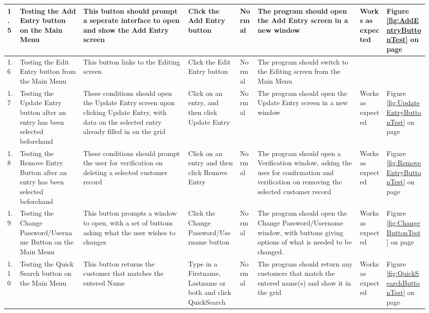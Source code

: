 \begin{landscape}
\begin{center}
\begin{longtable}{|p{1.5cm}|p{2cm}|p{2.5cm}|p{2.5cm}|p{2cm}|p{2cm}|p{2cm}|p{2cm}|}
        1.5 & Testing the Add Entry button on the Main Menu & This button should prompt a seperate interface to open and show the Add Entry screen & Click the Add Entry button & Normal & The program should open the Add Entry screen in a new window & Works as expected & Figure \ref{fig:AddEntryButtonTest} on page \pageref{fig:AddEntryButtonTest} \\ \hline
\rowcolor{gray} 1.6 & Testing the Edit Entry button from the Main Menu & This button links to the Editing screen & Click the Edit Entry button & Normal & The program should switch to the Editing screen from the Main Menu &  & \\ \hline
        1.7 & Testing the Update Entry button after an entry has been selected beforehand & These conditions should open the Update Entry screen upon clicking Update Entry, with data on the selected entry already filled in on the grid & Click on an entry, and then click Update Entry & Normal & The program should open the Update Entry screen in a new window & Works as expected & Figure \ref{fig:UpdateEntryButtonTest} on page \pageref{fig:UpdateEntryButtonTest} \\ \hline
        1.8 & Testing the Remove Entry Button after an entry has been selected beforehand & These conditions should prompt the user for verification on deleting a selected customer record & Click on an entry and then click Remove Entry & Normal & The program should open a Verification window, asking the user for confirmation and verification on removing the selected customer record & Works as expected & Figure \ref{fig:RemoveEntryButtonTest} on page \pageref{fig:RemoveEntryButtonTest} \\ \hline
\rowcolor{lightgray} 1.9 & Testing the Change Password/Username Button on the Main Menu & This button prompts a window to open, with a set of buttons asking what the user wishes to changes & Click the Change Password/Username button & Normal & The program should open the Change Password/Username window, with buttons giving options of what is needed to be changed. & Works as expected & Figure \ref{fig:ChangeButtonTest} on page \pageref{fig:ChangeButtonTest} \\ \hline
\rowcolor{lightgray} 1.10 & Testing the Quick Search button on the Main Menu & This button returns the customer that matches the entered Name & Type in a Firstname, Lastname or both and click QuickSearch & Normal & The program should return any customers that match the entered name(s) and show it in the grid & Works as expected & Figure \ref{fig:QuickSearchButtonTest} on page \pageref{fig:QuickSearchButtonTest} \\ \hline

\end{longtable}
\end{center}
\end{landscape}
